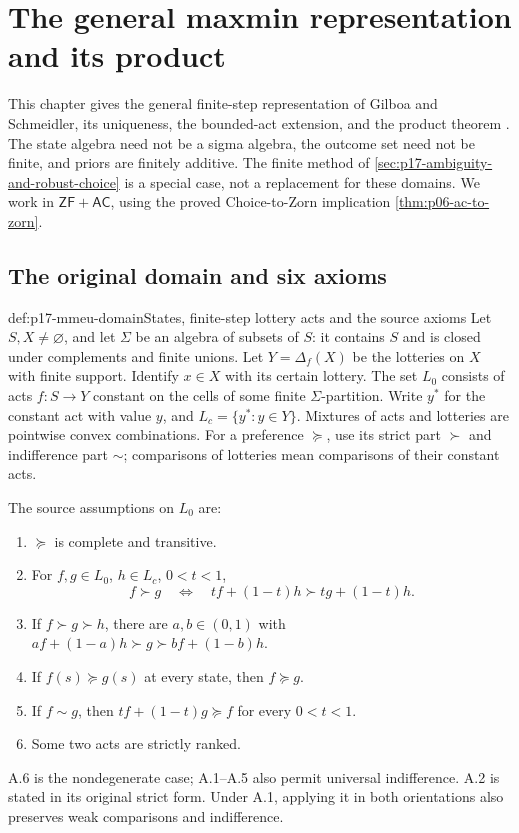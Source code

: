 \chapter{The general maxmin representation and its product}
\label{sec:p17-maxmin-representation}

This chapter gives the general finite-step representation of
Gilboa and Schmeidler, its uniqueness, the bounded-act extension,
and the product theorem \cite[pp.~143--152]{GilboaSchmeidler1989Maxmin}.
The state algebra need not be a sigma algebra, the outcome set
need not be finite, and priors are finitely additive.
The finite method of \cref{sec:p17-ambiguity-and-robust-choice}
is a special case, not a replacement for these domains.
We work in \(\mathsf{ZF}+\mathsf{AC}\), using the proved
Choice-to-Zorn implication \cref{thm:p06-ac-to-zorn}.

\section{The original domain and six axioms}

\begin{hbdefinition}{def:p17-mmeu-domain}{States, finite-step lottery acts and the source axioms}
Let \(S,X\ne\varnothing\), and let \(\Sigma\) be an algebra
of subsets of \(S\): it contains \(S\) and is closed under
complements and finite unions. Let \(Y=\Delta_f(X)\) be the
lotteries on \(X\) with finite support. Identify \(x\in X\)
with its certain lottery. The set \(L_0\) consists of acts
\(f:S\to Y\) constant on the cells of some finite
\(\Sigma\)-partition. Write \(y^*\) for the constant act
with value \(y\), and \(L_c=\{y^*:y\in Y\}\).
Mixtures of acts and lotteries are pointwise convex combinations.
For a preference \(\succeq\), use its strict part \(\succ\)
and indifference part \(\sim\); comparisons of lotteries mean
comparisons of their constant acts.

The source assumptions on \(L_0\) are:
\begin{enumerate}
\item[A.1] \(\succeq\) is complete and transitive.
\item[A.2] For \(f,g\in L_0\), \(h\in L_c\), \(0<t<1\),
\[
 f\succ g\quad\Longleftrightarrow\quad
          tf+(1-t)h\succ tg+(1-t)h .
\]
\item[A.3] If \(f\succ g\succ h\), there are \(a,b\in(0,1)\)
with \(af+(1-a)h\succ g\succ bf+(1-b)h\).
\item[A.4] If \(f(s)\succeq g(s)\) at every state, then
\(f\succeq g\).
\item[A.5] If \(f\sim g\), then \(tf+(1-t)g\succeq f\)
for every \(0<t<1\).
\item[A.6] Some two acts are strictly ranked.
\end{enumerate}
A.6 is the nondegenerate case; A.1--A.5 also permit universal
indifference. A.2 is stated in its original strict form.
Under A.1, applying it in both orientations also preserves
weak comparisons and indifference.
\end{hbdefinition}


